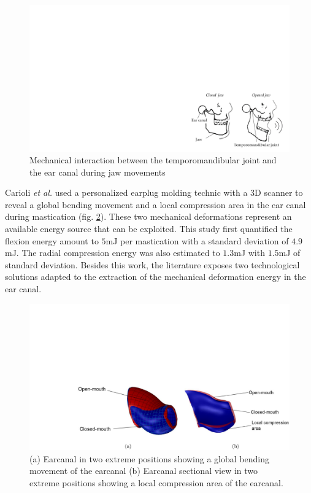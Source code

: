 \documentclass[3p,twocolumn,preprint]{elsarticle}
\begin{document}
\begin{figure}[!htbp]
	\centering
	\captionsetup{justification=centering}
	\includegraphics[trim={21cm 0cm 0cm 11.2cm},clip, width=0.9\linewidth]{figures/TMJ_on_earcanal.pdf}
	\caption{Mechanical interaction between the temporomandibular joint and the ear canal during jaw movements \cite{Delnavaz2012}}
	\label{fig:TMJ_on_earcanal}
\end{figure}
Carioli \emph{et al.} used a personalized earplug molding technic with a 3D scanner to reveal a global bending movement and a local compression area in the ear canal during mastication \cite{Carioli2016} (fig. \ref{fig:molding}). These two mechanical deformations represent an available energy source that can be exploited. This study first quantified the flexion energy amount to $5$mJ per mastication with a standard deviation of $4.9$mJ. The radial compression energy was also estimated to $1.3$mJ with $1.5$mJ of standard deviation. Besides this work, the literature exposes two technological solutions adapted to the extraction of the mechanical deformation energy in the ear canal. \\
\begin{figure}[!htbp]
	\centering
	\captionsetup{justification=centering}
	\includegraphics[trim={6cm 0cm 0cm 10cm},clip, width=0.6\linewidth]{figures/molding.pdf}
	\caption{(a) Earcanal in two extreme positions showing a global bending movement of the earcanal (b) Earcanal sectional view in two extreme positions showing a local compression area of the earcanal. \cite{Carioli2016}}
	\label{fig:molding}
\end{figure}
\end{document}

